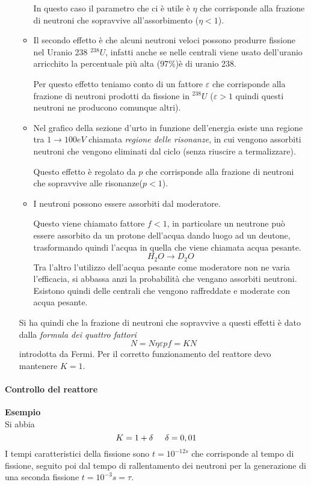 \begin{enumerate}
\begin{itemize}
In questo caso il parametro che ci è utile è $\eta$ che corrisponde alla frazione di neutroni che sopravvive all'assorbimento ($\eta<1$).

\item Il secondo effetto è che alcuni neutroni veloci possono produrre fissione nel Uranio 238 $^{238}U$, infatti anche se nelle centrali viene usato dell'uranio arricchito la percentuale più alta ($97\%$)è di uranio 238.

Per questo effetto teniamo conto di un fattore $\varepsilon$ che corrisponde alla frazione di neutroni prodotti da fissione in $^{238}U$ ($\varepsilon>1$ quindi questi neutroni ne producono comunque altri).

\item Nel grafico della sezione d'urto in funzione dell'energia esiste una regione tra $1\to 100eV$ chiamata \emph{regione delle risonanze}, in cui vengono assorbiti neutroni che vengono eliminati dal ciclo (senza riuscire a termalizzare).

Questo effetto è regolato da $p$ che corrisponde alla frazione di neutroni che sopravvive alle risonanze($p<1$).

\item I neutroni possono essere assorbiti dal moderatore.

Questo viene chiamato fattore $f<1$, in particolare un neutrone può essere assorbito da un protone dell'acqua dando luogo ad un deutone, trasformando quindi l'acqua in quella che viene chiamata acqua pesante.
\[
H_2O\to D_2O
\]
Tra l'altro l'utilizzo dell'acqua pesante come moderatore non ne varia l'efficacia, si abbassa anzi la probabilità che vengano assorbiti neutroni.
Esistono quindi delle centrali che vengono raffreddate e moderate con acqua pesante.
\end{itemize}
Si ha quindi che la frazione di neutroni che sopravvive a questi effetti è dato dalla \emph{formula dei quattro fattori}
\begin{equation}
N=N\eta\varepsilon p f=KN
\end{equation}
introdotta da Fermi.
Per il corretto funzionamento del reattore devo mantenere $K=1$.
\end{enumerate}

\paragraph{Controllo del reattore}

\textbf{Esempio}\\
Si abbia
\[
K=1+\delta\hspace{0.5cm}\delta=0,01
\]
I tempi caratteristici della fissione sono $t=10^{-12s}$ che corrisponde al tempo di fissione, seguito poi dal tempo di rallentamento dei neutroni per la generazione di una seconda fissione $t=10^{-3}s=\tau$.

